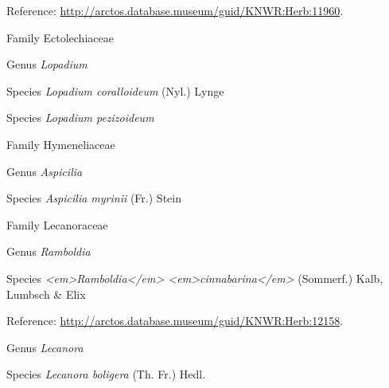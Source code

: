 \documentclass[9pt, article]{memoir}
\begin{document}
\begin{multicols}{2}
\vspace{6pt}Reference: 
\url{http://arctos.database.museum/guid/KNWR:Herb:11960}.

\vspace{6pt}\noindent\hspace{24pt}Family Ectolechiaceae


\vspace{6pt}\noindent\hspace{30pt}Genus \textit{Lopadium}


\vspace{6pt}\noindent\hspace{36pt}Species \textit{Lopadium coralloideum} (Nyl.) Lynge


\vspace{6pt}\noindent\hspace{36pt}Species \textit{Lopadium pezizoideum}


\vspace{6pt}\noindent\hspace{24pt}Family Hymeneliaceae


\vspace{6pt}\noindent\hspace{30pt}Genus \textit{Aspicilia}


\vspace{6pt}\noindent\hspace{36pt}Species \textit{Aspicilia myrinii} (Fr.) Stein


\vspace{6pt}\noindent\hspace{24pt}Family Lecanoraceae


\vspace{6pt}\noindent\hspace{30pt}Genus \textit{Ramboldia}


\vspace{6pt}\noindent\hspace{36pt}Species \textit{<em>Ramboldia</em> <em>cinnabarina</em>} (Sommerf.) Kalb, Lumbsch \& Elix


\vspace{6pt}Reference: 
\url{http://arctos.database.museum/guid/KNWR:Herb:12158}.

\vspace{6pt}\noindent\hspace{30pt}Genus \textit{Lecanora}


\vspace{6pt}\noindent\hspace{36pt}Species \textit{Lecanora boligera} (Th. Fr.) Hedl.



\end{multicols}
\end{document}
